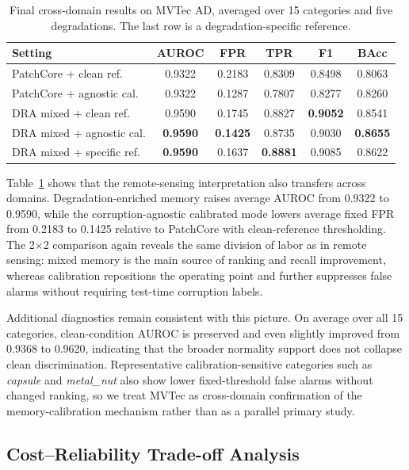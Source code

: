 \documentclass[remotesensing,article,submit,pdftex,moreauthors]{Definitions/mdpi}
\begin{document}
\begin{table}[!htbp]
\caption{Final cross-domain results on MVTec AD, averaged over 15 categories and five degradations. The last row is a degradation-specific reference.}
\label{tab:main}
\centering
\small
\setlength{\tabcolsep}{4pt}
\begin{tabular}{lccccc}
\hline
Setting & AUROC & FPR & TPR & F1 & BAcc \\
\hline
PatchCore + clean ref. & 0.9322 & 0.2183 & 0.8309 & 0.8498 & 0.8063 \\
PatchCore + agnostic cal. & 0.9322 & 0.1287 & 0.7807 & 0.8277 & 0.8260 \\
DRA mixed + clean ref. & 0.9590 & 0.1745 & 0.8827 & \textbf{0.9052} & 0.8541 \\
DRA mixed + agnostic cal. & \textbf{0.9590} & \textbf{0.1425} & 0.8735 & 0.9030 & \textbf{0.8655} \\
DRA mixed + specific ref. & \textbf{0.9590} & 0.1637 & \textbf{0.8881} & 0.9085 & 0.8622 \\
\hline
\end{tabular}
\end{table}

\noindent Table~\ref{tab:main} shows that the remote-sensing interpretation also transfers across domains. Degradation-enriched memory raises average AUROC from 0.9322 to 0.9590, while the corruption-agnostic calibrated mode lowers average fixed FPR from 0.2183 to 0.1425 relative to PatchCore with clean-reference thresholding. The 2$\times$2 comparison again reveals the same division of labor as in remote sensing: mixed memory is the main source of ranking and recall improvement, whereas calibration repositions the operating point and further suppresses false alarms without requiring test-time corruption labels.

\noindent Additional diagnostics remain consistent with this picture. On average over all 15 categories, clean-condition AUROC is preserved and even slightly improved from 0.9368 to 0.9620, indicating that the broader normality support does not collapse clean discrimination. Representative calibration-sensitive categories such as \textit{capsule} and \textit{metal\_nut} also show lower fixed-threshold false alarms without changed ranking, so we treat MVTec as cross-domain confirmation of the memory-calibration mechanism rather than as a parallel primary study.

\subsection{Cost--Reliability Trade-off Analysis}
\end{document}
